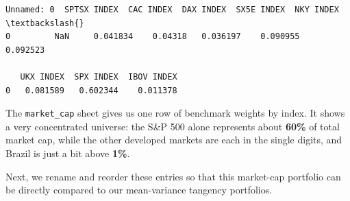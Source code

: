 \documentclass[11pt]{article}
\begin{document}
            \begin{tcolorbox}[breakable, size=fbox, boxrule=.5pt, pad at break*=1mm, opacityfill=0]
\begin{Verbatim}[commandchars=\\\{\}]
   Unnamed: 0  SPTSX INDEX  CAC INDEX  DAX INDEX  SX5E INDEX  NKY INDEX  \textbackslash{}
0         NaN     0.041834    0.04318   0.036197    0.090955   0.092523

   UKX INDEX  SPX INDEX  IBOV INDEX
0   0.081589   0.602344    0.011378
\end{Verbatim}
\end{tcolorbox}
        
    The \texttt{market\_cap} sheet gives us one row of benchmark weights by
index. It shows a very concentrated universe: the S\&P 500 alone
represents about \textbf{60\%} of total market cap, while the other
developed markets are each in the single digits, and Brazil is just a
bit above \textbf{1\%}.

Next, we rename and reorder these entries so that this market-cap
portfolio can be directly compared to our mean-variance tangency
portfolios.
\end{document}
